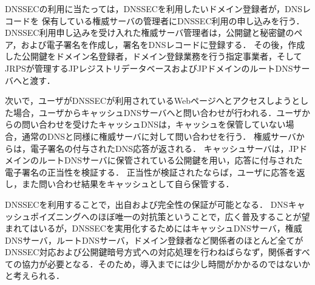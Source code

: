 DNSSECの利用に当たっては，DNSSECを利用したいドメイン登録者が，DNSレコードを
保有している権威サーバの管理者にDNSSEC利用の申し込みを行う．
DNSSEC利用申し込みを受け入れた権威サーバ管理者は，公開鍵と秘密鍵のペア，および電子署名を作成し，署名をDNSレコードに登録する．
その後，作成した公開鍵をドメイン名登録者，ドメイン登録業務を行う指定事業者，そしてJRPSが管理するJPレジストリデータベースおよびJPドメインのルートDNSサーバへと渡す．

次いで，ユーザがDNSSECが利用されているWebページへとアクセスしようとした場合，ユーザからキャッシュDNSサーバへと問い合わせが行われる．ユーザからの問い合わせを受けたキャッシュDNSは，キャッシュを保管していない場合，通常のDNSと同様に権威サーバに対して問い合わせを行う．
権威サーバからは，電子署名の付与されたDNS応答が返される．
キャッシュサーバは，JPドメインのルートDNSサーバに保管されている公開鍵を用い，応答に付与された電子署名の正当性を検証する．
正当性が検証されたならば，ユーザに応答を返し，また問い合わせ結果をキャッシュとして自ら保管する．

DNSSECを利用することで，出自および完全性の保証が可能となる．\cite{jrps_dnssec}
DNSキャッシュポイズニングへのほぼ唯一の対抗策ということで，広く普及することが望まれてはいるが，DNSSECを実用化するためにはキャッシュDNSサーバ，権威DNSサーバ，ルートDNSサーバ，ドメイン登録者など関係者のほとんど全てがDNSSEC対応および公開鍵暗号方式への対応処理を行わねばらなず，関係者すべての協力が必要となる．そのため，導入までには少し時間がかかるのではないかと考えられる．
